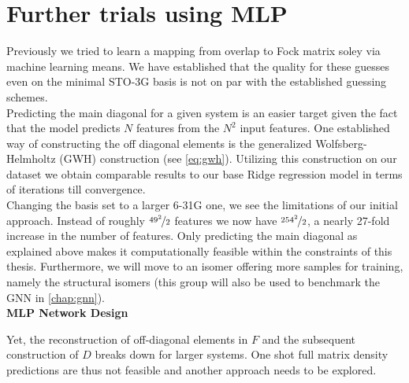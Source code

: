 \section{Further trials using MLP}
\label{sec:further_trials_mlp}
Previously we tried to learn a mapping from overlap to Fock matrix soley via machine learning means. We have established that the quality for these guesses even on the minimal STO-3G basis is not on par with the established guessing schemes.\\
Predicting the main diagonal for a given system is an easier target given the fact that the model predicts $N$ features from the $N^2$ input features. One established way of constructing the off diagonal elements is the generalized Wolfsberg-Helmholtz (GWH) construction \parencite{ref:gwh_wolfsberg1952spectra} (see \autoref{eq:gwh}).
Utilizing this construction on our dataset we obtain comparable results to our base Ridge regression model in terms of iterations till convergence. \\
Changing the basis set to a larger 6-31G one, we see the limitations of our initial approach. Instead of roughly $\nicefrac{49^2}{2}$ features we now have $\nicefrac{254^2}{2}$, a nearly 27-fold increase in the number of features. Only predicting the main diagonal as explained above makes it computationally feasible within the constraints of this thesis. Furthermore, we will move to an isomer offering more samples for training, namely the  structural isomers (this group will also be used to benchmark the GNN in \autoref{chap:gnn}).\\

\textbf{MLP Network Design}\\

\begin{table}[h]
    \centering
    \caption{ /}
    \label{tab:NN_basic_metrics}
\end{table}

Yet, the reconstruction of off-diagonal elements in $F$ and the subsequent construction of $D$ breaks down for larger systems. One shot full matrix density predictions are thus not feasible and another approach needs to be explored.\\ 
